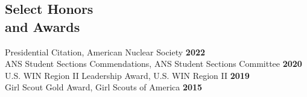 \documentclass[margin,line]{resume}
\begin{document}
\begin{resume}
    \section{\mysidestyle Select Honors \\and Awards}
    Presidential Citation, American Nuclear Society \hfill \textbf{2022}\vspace{.5mm}\\
    ANS Student Sections Commendations, ANS Student Sections Committee \hfill \textbf{2020}\vspace{.5mm}\\%
    U.S. WIN Region II Leadership Award, U.S. WIN Region II \hfill \textbf{2019}\vspace{.5mm}\\%
    Girl Scout Gold Award, Girl Scouts of America \hfill \textbf{2015}\vspace{.5mm}\\%
    \vspace{-7mm}


\end{resume}
\end{document}
